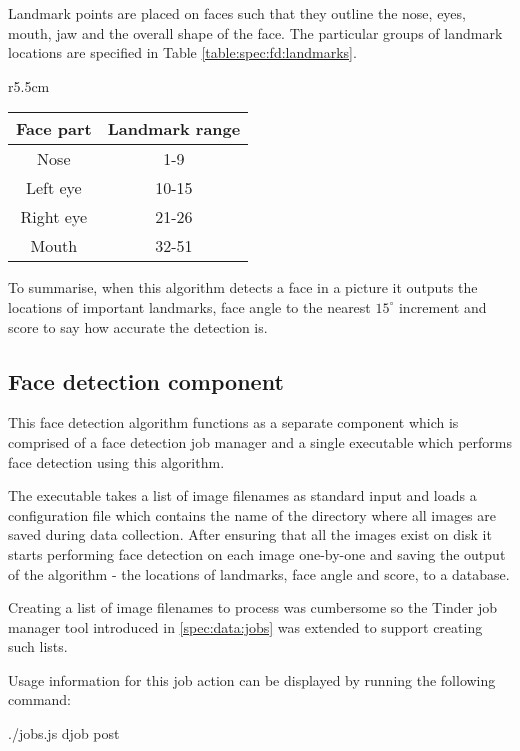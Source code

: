 Landmark points are placed on faces such that they outline the nose, eyes,
mouth, jaw and the overall shape of the face. The particular groups of landmark
locations are specified in Table \ref{table:spec:fd:landmarks}.

\begin{wraptable}{r}{5.5cm}
    \begin{tabular}{cc}\\\toprule  
        Face part & Landmark range \\\midrule
        Nose      & 1-9 \\  \midrule
        Left eye  & 10-15 \\  \midrule
        Right eye & 21-26\\  \midrule
        Mouth     & 32-51 \\  \bottomrule
    \end{tabular}
    \caption{A wrapped table going nicely inside the text.}
    \label{table:spec:fd:landmarks}
\end{wraptable} 

To summarise, when this algorithm detects a face in a picture it outputs the 
locations of important landmarks, face angle to the nearest $15^\circ$
increment and score to say how accurate the detection is.

\subsection{Face detection component}
This face detection algorithm functions as a separate component which is
comprised of a face detection job manager and a single executable which
performs face detection using this algorithm.

The executable takes a list of image filenames as standard input and loads a
configuration file which contains the name of the directory where all images
are saved during data collection. After ensuring that all the images exist on
disk it starts performing face detection on each image one-by-one and saving
the output of the algorithm - the locations of landmarks, face angle and score,
to a database.

Creating a list of image filenames to process was cumbersome so the Tinder job
manager tool introduced in \ref{spec:data:jobs} was extended to support
creating such lists. 

Usage information for this job action can be displayed by running the following
command:
\begin{logs}
./jobs.js djob post
\end{logs}

